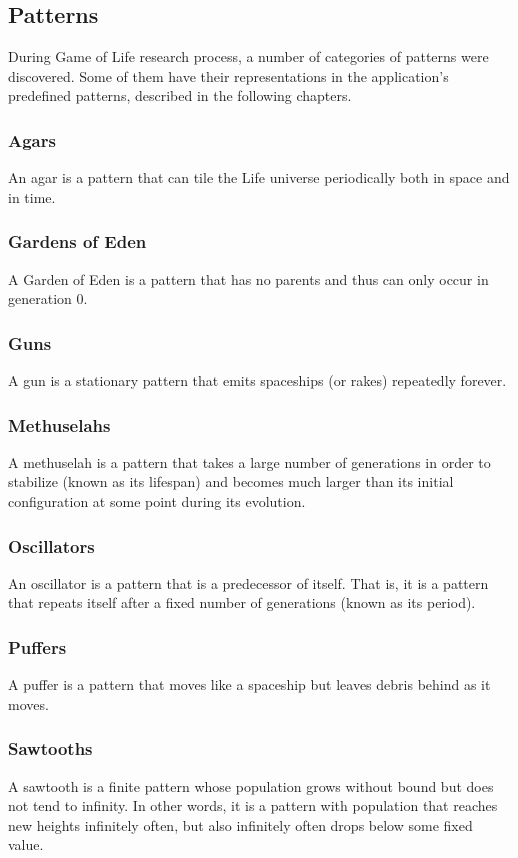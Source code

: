 \documentclass[11pt,a4paper]{article}
\begin{document}
\newpage
\subsection{Patterns}
During Game of Life research process, a number of categories of patterns were discovered. Some of them have their representations in the application's predefined patterns, described in the following chapters.

\subsubsection{Agars}
An agar is a pattern that can tile the Life universe periodically both in space and in time.

\subsubsection{Gardens of Eden}
A Garden of Eden is a pattern that has no parents and thus can only occur in generation 0.

\subsubsection{Guns}
A gun is a stationary pattern that emits spaceships (or rakes) repeatedly forever.

\subsubsection{Methuselahs}
A methuselah is a pattern that takes a large number of generations in order to stabilize (known as its lifespan) and becomes much larger than its initial configuration at some point during its evolution.

\subsubsection{Oscillators}
An oscillator is a pattern that is a predecessor of itself. That is, it is a pattern that repeats itself after a fixed number of generations (known as its period).

\subsubsection{Puffers}
A puffer is a pattern that moves like a spaceship but leaves debris behind as it moves.

\subsubsection{Sawtooths}
A sawtooth is a finite pattern whose population grows without bound but does not tend to infinity. In other words, it is a pattern with population that reaches new heights infinitely often, but also infinitely often drops below some fixed value.
\end{document}

